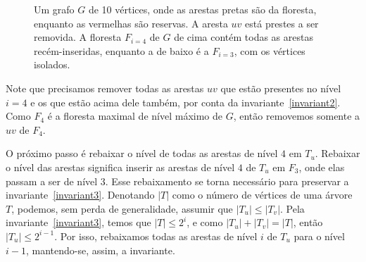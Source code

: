 \begin{figure}[H]
\begin{minipage}[c]{0.8\textwidth}
    \end{minipage}
    \caption{Um grafo $G$ de 10 vértices, onde as arestas pretas são da floresta, enquanto as vermelhas são reservas. A aresta $uv$ está prestes a ser removida. A floresta $F_{i = 4}$ de $G$ de cima contém todas as arestas recém-inseridas, enquanto a de baixo é a $F_{i = 3}$, com os vértices isolados.}
    \vspace{-1cm}
    \label{fig:example-replacement1}
\end{figure}

Note que precisamos remover todas as arestas $uv$ que estão presentes no nível $i = 4$ e os que estão acima dele também, por conta da invariante~\ref{invariant2}. Como $F_4$ é a floresta maximal de nível máximo de $G$, então removemos somente a $uv$ de $F_4$. 

O próximo passo é rebaixar o nível de todas as arestas de nível $4$ em $T_u$. Rebaixar o nível das arestas significa inserir as arestas de nível $4$ de $T_u$ em $F_3$, onde elas passam a ser de nível $3$. Esse rebaixamento se torna necessário para preservar a invariante~\ref{invariant3}. Denotando $|T|$ como o número de vértices de uma árvore $T$, podemos, sem perda de generalidade, assumir que $|T_u| \leq |T_v|$. Pela invariante~\ref{invariant3}, temos que $|T| \leq 2^i$, e como $|T_u| + |T_v| = |T|$, então $|T_u| \leq 2^{i-1}$. Por isso, rebaixamos todas as arestas de nível $i$ de $T_u$ para o nível $i-1$, mantendo-se, assim, a invariante. 

